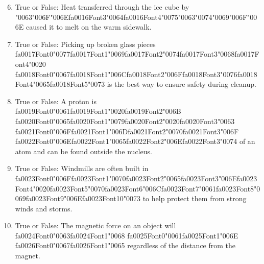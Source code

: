 \documentclass[12pt]{article}
\begin{document}
\begin{enumerate}[label=\arabic*.]
\setcounter{enumi}{5}
\item True or False: Heat transferred through the ice cube by {\char"0063}{\char"006F}{\char"006E}{\csname fa0016Font3\endcsname\char"0064}{\csname fa0016Font4\endcsname\char"0075}{\char"0063}{\char"0074}{\char"0069}{\char"006F}{\char"006E} caused it to melt on the warm sidewalk.
\item True or False: Picking up broken glass pieces {\csname fa0017Font0\endcsname\char"0077}{\csname fa0017Font1\endcsname\char"0069}{\csname fa0017Font2\endcsname\char"0074}{\csname fa0017Font3\endcsname\char"0068}{\csname fa0017Font4\endcsname\char"0020} {\csname fa0018Font0\endcsname\char"0067}{\csname fa0018Font1\endcsname\char"006C}{\csname fa0018Font2\endcsname\char"006F}{\csname fa0018Font3\endcsname\char"0076}{\csname fa0018Font4\endcsname\char"0065}{\csname fa0018Font5\endcsname\char"0073} is the best way to ensure safety during cleanup.
\item True or False: A proton is {\csname fa0019Font0\endcsname\char"0061}{\csname fa0019Font1\endcsname\char"0020}{\csname fa0019Font2\endcsname\char"006B} {\csname fa0020Font0\endcsname\char"0065}{\csname fa0020Font1\endcsname\char"0079}{\csname fa0020Font2\endcsname\char"0020}{\csname fa0020Font3\endcsname\char"0063} {\csname fa0021Font0\endcsname\char"006F}{\csname fa0021Font1\endcsname\char"006D}{\csname fa0021Font2\endcsname\char"0070}{\csname fa0021Font3\endcsname\char"006F} {\csname fa0022Font0\endcsname\char"006E}{\csname fa0022Font1\endcsname\char"0065}{\csname fa0022Font2\endcsname\char"006E}{\csname fa0022Font3\endcsname\char"0074} of an atom and can be found outside the nucleus.
\item True or False: Windmills are often built in {\csname fa0023Font0\endcsname\char"006F}{\csname fa0023Font1\endcsname\char"0070}{\csname fa0023Font2\endcsname\char"0065}{\csname fa0023Font3\endcsname\char"006E}{\csname fa0023Font4\endcsname\char"0020}{\csname fa0023Font5\endcsname\char"0070}{\csname fa0023Font6\endcsname\char"006C}{\csname fa0023Font7\endcsname\char"0061}{\csname fa0023Font8\endcsname\char"0069}{\csname fa0023Font9\endcsname\char"006E}{\csname fa0023Font10\endcsname\char"0073} to help protect them from strong winds and storms.
\item True or False: The magnetic force on an object will {\csname fa0024Font0\endcsname\char"0063}{\csname fa0024Font1\endcsname\char"0068} {\csname fa0025Font0\endcsname\char"0061}{\csname fa0025Font1\endcsname\char"006E} {\csname fa0026Font0\endcsname\char"0067}{\csname fa0026Font1\endcsname\char"0065} regardless of the distance from the magnet.
\end{enumerate}
\end{document}
